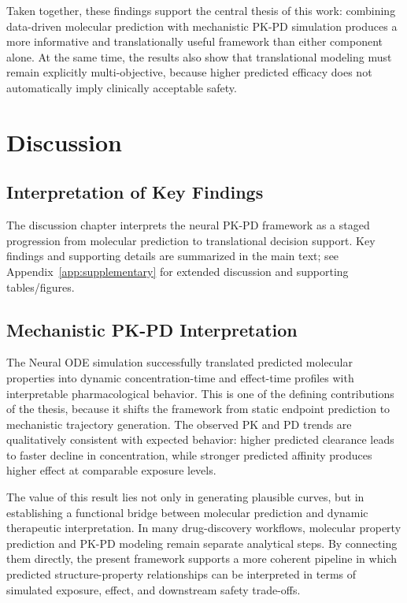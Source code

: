 \documentclass[a4paper,11pt,twoside]{report}
\begin{document}
Taken together, these findings support the central thesis of this work: combining data-driven molecular prediction with mechanistic PK-PD simulation produces a more informative and translationally useful framework than either component alone. At the same time, the results also show that translational modeling must remain explicitly multi-objective, because higher predicted efficacy does not automatically imply clinically acceptable safety.

\chapter{Discussion}

\section{Interpretation of Key Findings}

The discussion chapter interprets the neural PK-PD framework as a staged progression from molecular prediction to translational decision support. Key findings and supporting details are summarized in the main text; see Appendix~\ref{app:supplementary} for extended discussion and supporting tables/figures.

\section{Mechanistic PK-PD Interpretation}

The Neural ODE simulation successfully translated predicted molecular properties into dynamic concentration-time and effect-time profiles with interpretable pharmacological behavior. This is one of the defining contributions of the thesis, because it shifts the framework from static endpoint prediction to mechanistic trajectory generation. The observed PK and PD trends are qualitatively consistent with expected behavior: higher predicted clearance leads to faster decline in concentration, while stronger predicted affinity produces higher effect at comparable exposure levels.

The value of this result lies not only in generating plausible curves, but in establishing a functional bridge between molecular prediction and dynamic therapeutic interpretation. In many drug-discovery workflows, molecular property prediction and PK-PD modeling remain separate analytical steps. By connecting them directly, the present framework supports a more coherent pipeline in which predicted structure-property relationships can be interpreted in terms of simulated exposure, effect, and downstream safety trade-offs.
\end{document}
